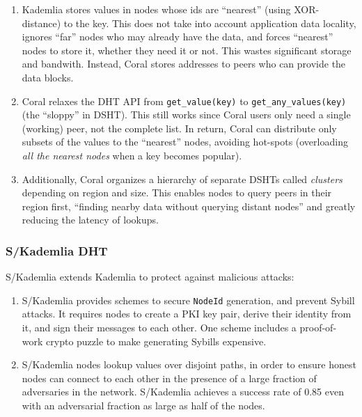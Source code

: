 \documentclass{sig-alternate}
\begin{document}
\begin{enumerate}

  \item Kademlia stores values in nodes whose ids are ``nearest'' (using
        XOR-distance) to the key. This does not take into account application
        data locality, ignores ``far'' nodes who may already have the data, and
        forces ``nearest'' nodes to store it, whether they need it or not.
        This wastes significant storage and bandwith. Instead, Coral stores
        addresses to peers who can provide the data blocks.

  \item Coral relaxes the DHT API from \texttt{get\_value(key)} to
        \texttt{get\_any\_values(key)} (the ``sloppy'' in DSHT).
        This still works since Coral users only need a single (working) peer,
        not the complete list. In return, Coral can distribute only subsets of
        the values to the ``nearest'' nodes, avoiding hot-spots (overloading
        \textit{all the nearest nodes} when a key becomes popular).

  \item Additionally, Coral organizes a hierarchy of separate DSHTs called
        \textit{clusters} depending on region and size. This enables nodes to
        query peers in their region first, ``finding nearby data without
        querying distant nodes'' and greatly reducing the latency of
        lookups.

\end{enumerate}

\subsubsection{S/Kademlia DHT}

S/Kademlia extends Kademlia to protect against malicious attacks:

\begin{enumerate}

  \item S/Kademlia provides schemes to secure \texttt{NodeId} generation,
        and prevent Sybill attacks. It requires nodes to create a PKI key pair, derive their identity from it, and sign their messages to each other. One scheme includes a proof-of-work crypto puzzle to make generating Sybills expensive.

  \item S/Kademlia nodes lookup values over disjoint paths, in order to
        ensure honest nodes can connect to each other in the presence of a large fraction of adversaries in the network. S/Kademlia achieves a success rate of 0.85 even with an adversarial fraction as large as half of the nodes.

\end{enumerate}
\end{document}
